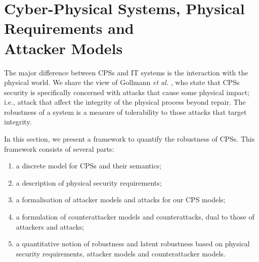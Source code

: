 \section{Cyber-Physical Systems, Physical Requirements and \\Attacker Models}
The major difference between CPSs and IT systems is the interaction with the physical world. We share the view of Gollmann \emph{et al.} \cite{CPSSecVinyl}, who state that CPSs security is {specifically} concerned with attacks that cause some physical impact; i.e., attack that affect the integrity of the physical process beyond repair. The robustness of a system is a measure of tolerability to those attacks that target integrity. 

In this section, we present a framework to quantify the robustness of CPSs. This framework consists of several parts:
\begin{enumerate}
  \item a discrete model for CPSs and their semantics; 
  \item a description of physical security requirements;
  \item a formalisation of attacker models and attacks for our CPS models;
  \item a formulation of counterattacker models and counterattacks, dual to those of attackers and attacks;
  \item a quantitative notion of robustness and latent robustness based on physical security requirements, attacker models and counterattacker models.
\end{enumerate}

